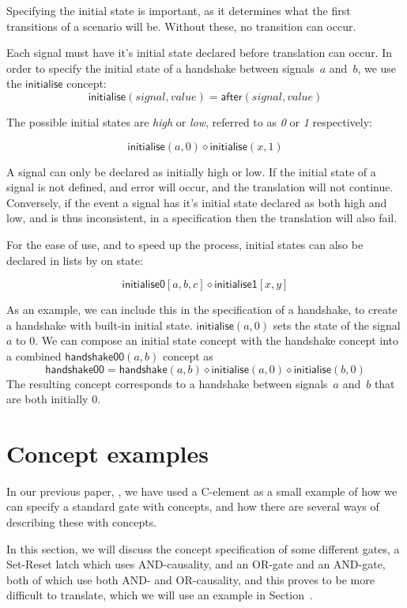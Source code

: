 \documentclass[british, journal]{IEEEtran}
\begin{document}
Specifying the initial state is important, as it determines what the first transitions
of a scenario will be. Without these, no transition can occur.

Each signal must have it's initial state declared before translation can occur. 
In order to specify the initial state of a handshake between signals~$a$
and~$b$, we use the $\mathsf{initialise}$ concept:
\[
\mathsf{initialise}(\mathit{signal},\mathit{value})=\mathsf{after}(signal,
value)
\]

\noindent The possible initial states are \emph{high} or \emph{low}, referred to as \emph{0} 
or \emph{1} respectively:

\[
\mathsf{initialise}(a,0) \diamond \mathsf{initialise}(x, 1)
\]

\noindent A signal can only be declared as initially high or low. If the initial state of a signal is 
not defined, and error will occur, and the translation will not continue. Conversely, 
if the event a signal has it's initial state declared as both high and low,
and is thus inconsistent, in a specification then the translation will also fail.

For the ease of use, and to speed up the process, initial states can also be declared
in lists by on state:

\[
\mathsf{initialise0} [a, b, c] \diamond \mathsf{initialise1} [x, y]
\]

\noindent As an example, we can include this in the specification of a handshake, to 
create a handshake with built-in initial state.
$\mathsf{initialise}(a, 0)$ sets the state of the signal
$a$ to $0$. We can compose an initial state concept with the handshake concept
into a combined $\mathsf{handshake00}(a, b)$ concept as
\[
\mathsf{handshake00} = \mathsf{handshake}(a, b) \diamond \mathsf{initialise}(a, 0) \diamond
\mathsf{initialise}(b, 0)
\]
The resulting concept corresponds to a handshake between signals~$a$
and~$b$ that are both initially $0$.

\section{Concept examples \label{sec:gate-examples}}

In our previous paper, \cite{2015_Beaumont_MEMOCODE}, we have 
used a C-element as a small example of how we can specify a standard gate with concepts,
and how there are several ways of describing these with concepts. 

In this section, we will discuss the concept specification of some different gates,
a Set-Reset latch which uses AND-causality, and an OR-gate and an AND-gate, both of 
which use both AND- and OR-causality, and this proves to be more difficult to translate,
which we will use an example in Section~\label{translation-algorithm}.
\end{document}
